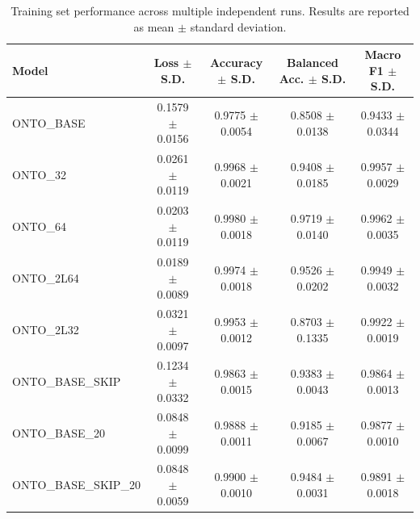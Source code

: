 \begin{table}[t]
\centering
\begin{tabular}{l c c c c}
\toprule
Model & Loss $\pm$ S.D. & Accuracy $\pm$ S.D. & Balanced Acc. $\pm$ S.D. & Macro F1 $\pm$ S.D. \\
\midrule
ONTO\_BASE & 0.1579 $\pm$ 0.0156 & 0.9775 $\pm$ 0.0054 & 0.8508 $\pm$ 0.0138 & 0.9433 $\pm$ 0.0344 \\
ONTO\_32 & 0.0261 $\pm$ 0.0119 & 0.9968 $\pm$ 0.0021 & 0.9408 $\pm$ 0.0185 & 0.9957 $\pm$ 0.0029 \\
ONTO\_64 & 0.0203 $\pm$ 0.0119 & 0.9980 $\pm$ 0.0018 & 0.9719 $\pm$ 0.0140 & 0.9962 $\pm$ 0.0035 \\
ONTO\_2L64 & 0.0189 $\pm$ 0.0089 & 0.9974 $\pm$ 0.0018 & 0.9526 $\pm$ 0.0202 & 0.9949 $\pm$ 0.0032 \\
ONTO\_2L32 & 0.0321 $\pm$ 0.0097 & 0.9953 $\pm$ 0.0012 & 0.8703 $\pm$ 0.1335 & 0.9922 $\pm$ 0.0019 \\
ONTO\_BASE\_SKIP & 0.1234 $\pm$ 0.0332 & 0.9863 $\pm$ 0.0015 & 0.9383 $\pm$ 0.0043 & 0.9864 $\pm$ 0.0013 \\
ONTO\_BASE\_20 & 0.0848 $\pm$ 0.0099 & 0.9888 $\pm$ 0.0011 & 0.9185 $\pm$ 0.0067 & 0.9877 $\pm$ 0.0010 \\
ONTO\_BASE\_SKIP_20 & 0.0848 $\pm$ 0.0059 & 0.9900 $\pm$ 0.0010 & 0.9484 $\pm$ 0.0031 & 0.9891 $\pm$ 0.0018 \\
\bottomrule
\end{tabular}
\caption{Training set performance across multiple independent runs. Results are reported as mean $\pm$ standard deviation.}
\label{tab:training_rn_results}
\end{table}